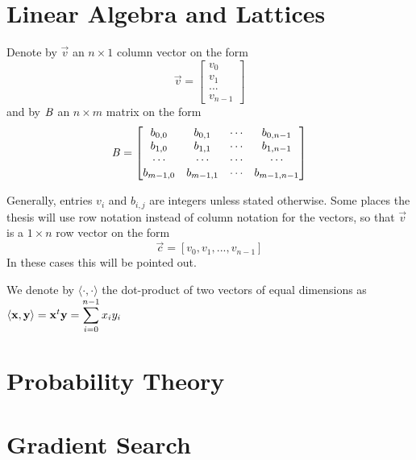 \section{Linear Algebra and Lattices}
Denote by $\vec{v}$ an $n \times 1$ column vector on the form 
\[ \vec{v} = \begin{bmatrix} v_0 \\ v_1 \\ ... \\ v_{n-1} \end{bmatrix}\] and by $\mathit{B}$ an $n \times m$ matrix on the form 
\[
    \mathit{B} = 
    \begin{bmatrix}
        b_{0,0} & b_{0,1} & \cdots & b_{0, n-1} \\ 
        b_{1,0} & b_{1,1} & \cdots & b_{1, n-1} \\ 
        \cdots & \cdots & \cdots & \cdots\\
        b_{m-1,0} & b_{m-1,1} & \cdots & b_{m-1, n-1} \\ 
    \end{bmatrix}
\]

Generally, entries $v_i$ and $b_{i, j}$ are integers unless stated otherwise.
Some places the thesis will use row notation instead of column notation for the vectors, so that $\vec{v}$ is a $1 \times n$ row vector on the form
\[\vec{c} = [v_0, v_1, ..., v_{n-1}]\] In these cases this will be pointed out.

We denote by $\langle \cdot, \cdot \rangle$ the dot-product of two vectors of equal dimensions as \\
$\langle \vec{x}, \vec{y} \rangle = \vec{x}^t \vec{y} = \mathlarger{\sum_{i=0}^{n-1} x_i y_i}$
\section{Probability Theory}
\section{Gradient Search}
